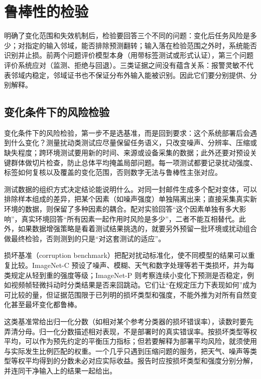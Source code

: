 \section{鲁棒性的检验}
\label{sec:robustness-evaluation}

明确了变化范围和失效机制后，检验要回答三个不同的问题：变化后任务风险是多少；对指定的输入邻域，能否排除预测翻转；输入落在检验范围之外时，系统能否识别并止损。前两个问题评价模型本身（用带标签测试或形式认证），第三个问题评价系统应对（监测、拒绝与回退）。三类证据之间没有蕴含关系：报警灵敏不代表邻域内稳定，邻域证书也不保证分布外输入能被识别。因此它们要分别提供、分别解释。

\subsection{变化条件下的风险检验}
\label{sec:robustness-risk-test}

变化条件下的风险检验，第一步不是选基准，而是回到要求：这个系统部署后会遇到什么变化？测量扰动类测试应尽量保留任务语义，只改变噪声、分辨率、压缩或缺失程度；跨环境测试要用新的时间、来源或设备采集的数据；此外还要对预设关键群体做切片检查，防止总体平均掩盖局部问题。每一项测试都要记录扰动强度、标签如何复核以及覆盖的变化范围，否则数字无法与鲁棒性主张对应。

测试数据的组织方式决定结论能说明什么。对同一封邮件生成多个配对变体，可以排除样本组成的差异，把某个因素（如噪声强度）单独隔离出来；直接采集真实新环境的数据，则保留了多种因素的耦合。配对实验回答“这个因素单独有多大影响”，真实环境回答“所有因素一起作用时风险是多少”，二者不能互相替代。此外，如果数据增强策略是看着测试结果挑选的，就要另外预留一批环境或扰动组合做最终检验，否则测到的只是“对这套测试的适应”。

损坏基准（corruption benchmark）把配对扰动标准化，使不同模型的结果可以重复比较。ImageNet-C 预设了噪声、模糊、天气和数字处理等若干类损坏，并为每类规定从轻到重的强度等级；ImageNet-P 则考察连续小变化下预测是否稳定，例如视频帧轻微抖动时分类结果是否来回跳动。它们让“在规定压力下表现如何”成为可比较的量，但证据范围限于已列明的损坏类型和强度，不能外推为对所有自然变化甚至最坏变化都鲁棒。

这类基准常给出归一化分数（如相对某个参考分类器的损坏错误率），读数时要先弄清分母。归一化分数描述相对表现，不是部署时的真实错误率。按损坏类型等权平均，可以作为预先约定的平衡压力指标；但若要解释为部署平均风险，就须使用与实际发生比例匹配的权重。一个几乎只遇到压缩问题的服务，把天气、噪声等类型等权平均得到的分数未必对应实际收益。报告时应按损坏类型和强度分别分解，并连同干净输入上的结果一起给出。

